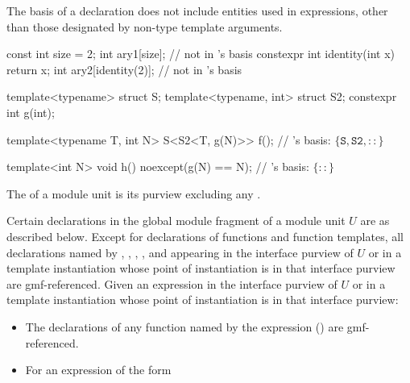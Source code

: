 \begin{std.txt}
\pnum
\begin{note}
The basis of a declaration
does not include entities used in expressions,
other than those designated by non-type template arguments.
\begin{example}
\begin{codeblock}
const int size = 2;
int ary1[size];                         //  not in 's basis
constexpr int identity(int x) { return x; }
int ary2[identity(2)];                  //  not in 's basis

template<typename> struct S;
template<typename, int> struct S2;
constexpr int g(int);

template<typename T, int N>
S<S2<T, g(N)>> f();                     // 's basis: $\{ \mathtt{S}, \mathtt{S2}, \mathtt{::} \}$ 

template<int N>
void h() noexcept(g(N) == N);           // 's basis: $\{ \mathtt{::} \}$
\end{codeblock}
\end{example}
\end{note}

\pnum
The  of a module unit
is its purview excluding any .

\pnum
Certain declarations in the global module fragment of a module unit $U$
are 
as described below.
Except for declarations of functions and function templates,
all declarations
named by
,
,
,
, and
appearing
in the interface purview of $U$ or
in a template instantiation whose point of instantiation is in that interface purview
are gmf-referenced.
Given an expression
in the interface purview of $U$ or
in a template instantiation whose point of instantiation is in that interface purview:
\begin{itemize}
\item
The declarations of any function
named by the expression ()
are gmf-referenced.
\item
For an expression of the form


\end{itemize}
\end{std.txt}
